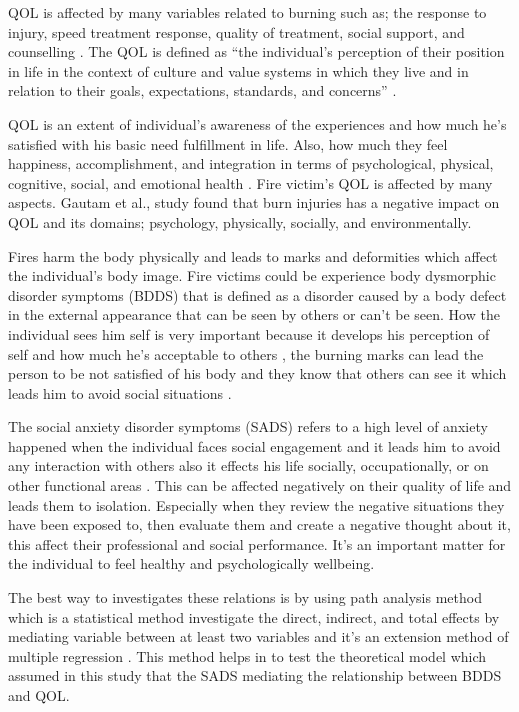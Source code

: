 \documentclass[10pt]{NSP1}
\begin{document}
QOL is affected by many variables related to burning such as; the response to injury, speed treatment response, quality of treatment, social support, and counselling \cite{ref3}. The QOL is defined as “the individual’s perception of their position in life in the context of culture and value systems in which they live and in relation to their goals, expectations, standards, and concerns” \cite{ref4}.

QOL is an extent of individual’s awareness of the experiences and how much he’s satisfied with his basic need fulfillment in life. Also, how much they feel happiness, accomplishment, and integration in terms of psychological, physical, cognitive, social, and emotional health \cite{ref5}. Fire victim’s QOL is affected by many aspects. Gautam et al., \cite{ref6} study found that burn injuries has a negative impact on QOL and its domains; psychology, physically, socially, and environmentally.

Fires harm the body physically and leads to marks and deformities which affect the individual’s body image. Fire victims could be experience body dysmorphic disorder symptoms (BDDS) that is defined as a disorder caused by a body defect in the external appearance that can be seen by others or can’t be seen\cite{ref7}. How the individual sees him self is very important because it develops his perception of self and how much he’s acceptable to others \cite{ref8}, the burning marks can lead the person to be not satisfied of his body and they know that others can see it which leads him to avoid social situations \cite{ref9}.

The social anxiety disorder symptoms (SADS) refers to a high level of anxiety happened when the individual faces social engagement and it leads him to avoid any interaction with others also it effects his life socially, occupationally, or on other functional areas \cite{ref10}. This can be affected negatively on their quality of life and leads them to isolation. Especially when they review the negative situations they have been exposed to, then evaluate them and create a negative thought about it, this affect their professional and social performance. It’s an important matter for the individual to feel healthy and psychologically wellbeing.

The best way to investigates these relations is by using path analysis method which is a statistical method investigate the direct, indirect, and total effects by mediating variable between at least two variables and it’s an extension method of multiple regression \cite{ref11}. This method helps in to test the theoretical model which assumed in this study that the SADS mediating the relationship between BDDS and QOL.
\end{document}
